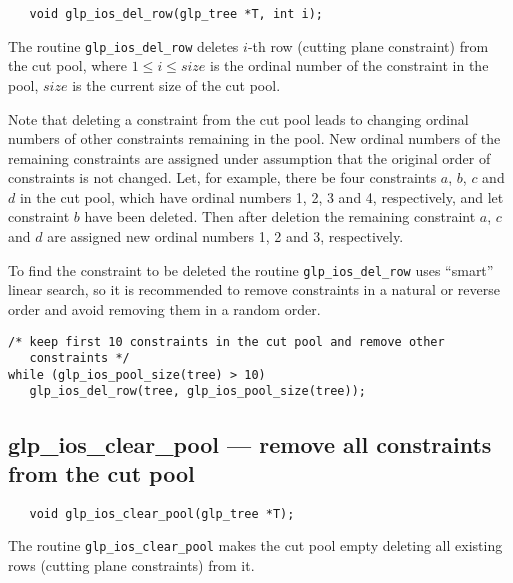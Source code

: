 \synopsis

\begin{verbatim}
   void glp_ios_del_row(glp_tree *T, int i);
\end{verbatim}

\description

The routine \verb|glp_ios_del_row| deletes $i$-th row (cutting plane
constraint) from the cut pool, where $1\leq i\leq size$ is the ordinal
number of the constraint in the pool, $size$ is the current size of the
cut pool.

Note that deleting a constraint from the cut pool leads to changing
ordinal numbers of other constraints remaining in the pool. New ordinal
numbers of the remaining constraints are assigned under assumption that
the original order of constraints is not changed. Let, for example,
there be four constraints $a$, $b$, $c$ and $d$ in the cut pool, which
have ordinal numbers 1, 2, 3 and 4, respectively, and let constraint
$b$ have been deleted. Then after deletion the remaining constraint $a$,
$c$ and $d$ are assigned new ordinal numbers 1, 2 and 3, respectively.

To find the constraint to be deleted the routine \verb|glp_ios_del_row|
uses ``smart'' linear search, so it is recommended to remove
constraints in a natural or reverse order and avoid removing them in
a random order.


\begin{verbatim}
/* keep first 10 constraints in the cut pool and remove other
   constraints */
while (glp_ios_pool_size(tree) > 10)
   glp_ios_del_row(tree, glp_ios_pool_size(tree));
\end{verbatim}

\subsection{glp\_ios\_clear\_pool --- remove all constraints from the
cut pool}

\synopsis

\begin{verbatim}
   void glp_ios_clear_pool(glp_tree *T);
\end{verbatim}

\description

The routine \verb|glp_ios_clear_pool| makes the cut pool empty deleting
all existing rows (cutting plane constraints) from it.

